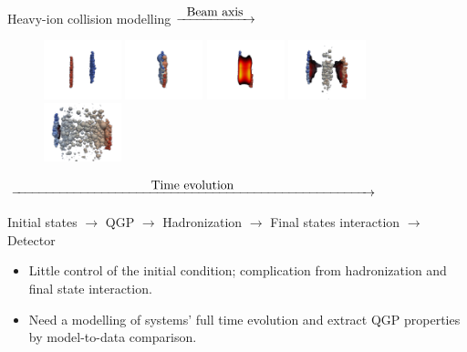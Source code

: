 \documentclass[11pt]{beamer}
\begin{document}
\begin{frame}{Heavy-ion collision modelling}
$\xrightarrow{\makebox[2cm]{Beam axis}}$
    \begin{figure}
   	\begin{center}
	\includegraphics[width=0.2\textwidth]{pics/new1.png} 
	\includegraphics[width=0.2\textwidth]{pics/new50.png} 
	\includegraphics[width=0.2\textwidth]{pics/new100.png}	
	\includegraphics[width=0.2\textwidth]{pics/new230.png}  
	\includegraphics[width=0.2\textwidth]{pics/new300.png}  
	\end{center} 	
  	\end{figure}
  	\begin{center}
  	$\xrightarrow{\makebox[10cm]{Time evolution}}$
  	\end{center}
\begin{center}
\color{blue} Initial states $\rightarrow$  \color{red} QGP \color{blue}  $\rightarrow$ Hadronization $\rightarrow$ Final states interaction $\rightarrow$ Detector
\end{center}
\begin{itemize}
\item Little control of the initial condition; complication from hadronization and final state interaction.
\item Need a modelling of systems' full time evolution and extract QGP properties by model-to-data comparison.
\end{itemize}
\end{frame}
\end{document}
